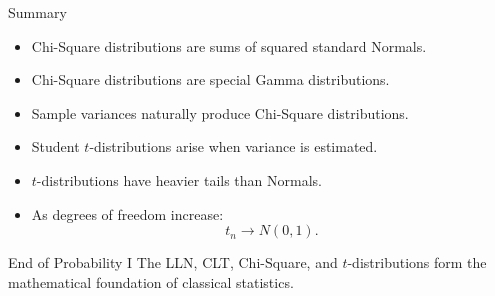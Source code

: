 \begin{frame}{Summary}
\begin{itemize}
    \item Chi-Square distributions are sums of squared standard Normals.

    \item Chi-Square distributions are special Gamma distributions.

    \item Sample variances naturally produce Chi-Square distributions.

    \item Student \(t\)-distributions arise when variance is estimated.

    \item \(t\)-distributions have heavier tails than Normals.

    \item As degrees of freedom increase:
    \[
    t_n
    \to
    N(0,1).
    \]
\end{itemize}

\vspace{0.25cm}

\begin{keybox}{End of Probability I}
The LLN, CLT, Chi-Square, and \(t\)-distributions form the mathematical foundation of classical statistics.
\end{keybox}
\end{frame}